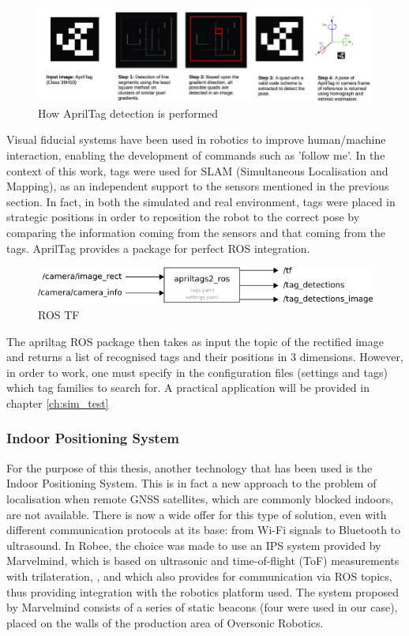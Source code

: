 \begin{figure}[H]
    \centering
    \includegraphics[scale=0.6]{Images/Chapter 3/apriltagsteps.png}
    \caption{How AprilTag detection is performed}
    \label{fig:apriltagsteps}
\end{figure}
Visual fiducial systems have been used in robotics to improve human/machine interaction, enabling the development of commands such as 'follow me'.
In the context of this work, tags were used for SLAM (Simultaneous Localisation and Mapping), as an independent support to the sensors mentioned in the previous section.
In fact, in both the simulated and real environment, tags were placed in strategic positions in order to reposition the robot to the correct pose by comparing the information coming from the sensors and that coming from the tags.
AprilTag provides a package for perfect ROS integration.
\begin{figure}[H]
    \centering
    \includegraphics{Images/Chapter 3/aprilros.png}
    \caption{ROS TF}
    \label{fig:aprilros}
\end{figure}

The apriltag ROS package then takes as input the topic of the rectified image and returns a list of recognised tags and their positions in 3 dimensions.
However, in order to work, one must specify in the configuration files (settings and tags) which tag families to search for.
A practical application will be provided in chapter \ref{ch:sim_test}

\subsubsection{Indoor Positioning System}

For the purpose of this thesis, another technology that has been used is the Indoor Positioning System.
This is in fact a new approach to the problem of localisation when remote GNSS satellites, which are commonly blocked indoors, are not available.
There is now a wide offer for this type of solution, even with different communication protocols at its base: from Wi-Fi signals to Bluetooth to ultrasound.
In Robee, the choice was made to use an IPS system provided by Marvelmind, which is based on ultrasonic and time-of-flight (ToF) measurements with trilateration, \citet{yorke2021beacon}, and which also provides for communication via ROS topics, thus providing integration with the robotics platform used.
The system proposed by Marvelmind consists of a series of static beacons (four were used in our case), placed on the walls of the production area of Oversonic Robotics.

